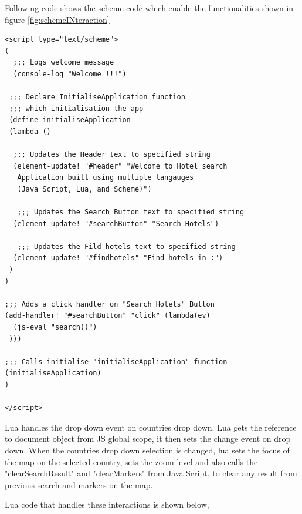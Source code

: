 Following code shows the scheme code which enable the functionalities shown in figure \ref{fig:schemeINteraction}

 \begin{lstlisting}[frame=single, style=base]
<script type="text/scheme">
(
  ;;; Logs welcome message
  (console-log "Welcome !!!")
 
 ;;; Declare InitialiseApplication function 
 ;;; which initialisation the app
 (define initialiseApplication
 (lambda ()
  
  ;;; Updates the Header text to specified string
  (element-update! "#header" "Welcome to Hotel search 
   Application built using multiple langauges
   (Java Script, Lua, and Scheme)")
  
   ;;; Updates the Search Button text to specified string
  (element-update! "#searchButton" "Search Hotels")
  
   ;;; Updates the Fild hotels text to specified string
  (element-update! "#findhotels" "Find hotels in :")
 )
)

;;; Adds a click handler on "Search Hotels" Button
(add-handler! "#searchButton" "click" (lambda(ev)
  (js-eval "search()")
 )))
 
;;; Calls initialise "initialiseApplication" function
(initialiseApplication)
)

</script>
 \end{lstlisting}
 
Lua handles the drop down event on countries drop down. Lua gets the reference to document object from JS global scope, it then sets the change event on drop down. When the countries drop down selection is changed, lua sets the focus of the map on the selected country, sets the zoom level and also calls the "clearSearchResult" and "clearMarkers" from Java Script, to clear any result from previous search and markers on the map. 

Lua code that handles these interactions is shown below, 
 

